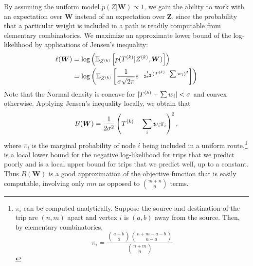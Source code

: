 \documentclass{article}
\begin{document}
By assuming the uniform model $p(Z|\bm W) \propto 1$, we gain the ability to work with an expectation over $\bm W$ instead of an expectation over $\bm Z$, since the probability that a particular weight is included in a path is readily computable from elementary combinatorics. We maximize an approximate lower bound of the log-likelihood by applications of Jensen's inequality: \begin{align*}
\ell(\bm W) &= \log\left({\mathbb{E}_{Z^{(k)}}\left[{p(T^{(k)}|Z^{(k)},\bm W)}\right]}\right) \\
&= \log\left({
\mathbb{E}_{Z^{(k)}}\left[{
\frac{1}{\sigma\sqrt{2\pi}} e^{
-\frac{1}{2\sigma^2}(T^{(k)} - \sum w_i)^2
}
}\right]
}\right) 
\end{align*}
Note that the Normal density is concave for $|T^{(k)} - \sum w_i| < \sigma$ and convex otherwise. Applying Jensen's inequality locally, we obtain that \[
B(\bm W) = \frac{1}{2\sigma^2}\left({T^{(k)} - \sum_i w_i \pi_i}\right)^2,
\]
where $\pi_i$ is the marginal probability of node $i$ being included in a uniform route,\footnote{$\pi_i$ can be computed analytically. Suppose the source and destination of the trip are $(n,m)$ apart and vertex $i$ is $(a,b)$ away from the source. Then, by elementary combinatorics, \[\pi_i = \frac{\binom{a+b}{a}\binom{n+m-a-b}{n-a}}{\binom{n+m}{n}}\]} is a local lower bound for the negative log-likelihood for trips that we predict poorly and is a local upper bound for trips that we predict well, up to a constant. Thus $B(\bm W)$ is a good approximation of the objective function that is easily computable, involving only $mn$ as opposed to $\binom{m+n}{n}$ terms.


 
\end{document}
